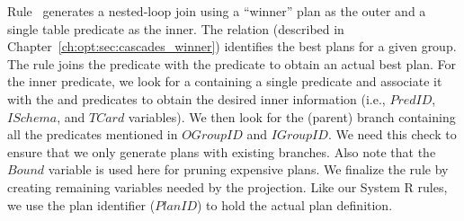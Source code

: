 Rule~ generates a nested-loop join  using a ``winner'' plan as
the outer and a single table predicate as the inner.  The  relation
(described in Chapter~\ref{ch:opt:sec:cascades_winner}) identifies the best
plans for a given group.  The rule joins the  predicate with the
 predicate to obtain an actual best plan.  For the inner predicate, we
look for a  containing a single predicate and associate it with the
 and  predicates to obtain the desired
inner information (i.e., $PredID$, $ISchema$, and $TCard$ variables).  We then look
for the (parent) branch containing all the predicates mentioned in $OGroupID$
and $IGroupID$.  We need this check to ensure that we only generate plans with
existing branches.  Also note that the $Bound$ variable is used here for
pruning expensive plans.  We finalize the rule by creating remaining variables
needed by the  projection.  Like our System R rules, we use the plan
identifier ($PlanID$) to hold the actual plan definition.

%
%
%


